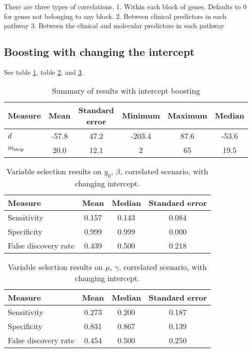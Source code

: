 There are three types of correlations.
1. Within each block of genes. Defaults to 0 for genes not belonging to any block.
2. Between clinical predictors in each pathway
3. Between the clinical and molecular predictors in each pathway


\subsection{Boosting with changing the intercept}
See table \ref{table:correlated-intercept-summary}, table \ref{table:correlated-intercept-y0}, and \ref{table:correlated-intercept-mu}.

\begin{table}
\caption{Summary of results with intercept boosting}
\label{table:correlated-intercept-summary}
\centering
\begin{tabular}{lccccc}
\toprule
Measure &    Mean &    Standard error &  Minimum & Maximum & Median \\
\hline
$d$    &    -57.8 & 47.2 &   -203.4 & 87.6 & -53.6 \\
$m_{\text{stop}}$      &    20.0 & 12.1 &     2 &    65 &  19.5 \\
\bottomrule
\end{tabular}
\end{table}

\begin{table}
\caption{Variable selection results on $y_0$, $\beta$, correlated scenario, with changing intercept.}
\label{table:correlated-intercept-y0}
\centering
\begin{tabular}{lccc}
\toprule
Measure &  Mean &  Median &  Standard error \\
\hline
Sensitivity & 0.157 &    0.143 & 0.084 \\
Specificity & 0.999 &    0.999 & 0.000 \\
False discovery rate & 0.439 & 0.500 & 0.218 \\
\bottomrule
\end{tabular}
\end{table}

\begin{table}
\caption{Variable selection results on $\mu$, $\gamma$, correlated scenario, with changing intercept.}
\label{table:correlated-intercept-mu}
\centering
\begin{tabular}{lccc}
\toprule
Measure     & Mean & Median   & Standard error     \\
\hline
Sensitivity &  0.273 &  0.200 & 0.187 \\
Specificity &  0.831 &  0.867 & 0.139 \\
False discovery rate &  0.454 &  0.500 & 0.250 \\
\bottomrule
\end{tabular}
\end{table}

